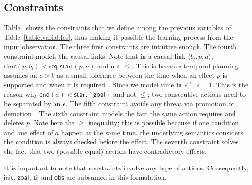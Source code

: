 \documentclass[runningheads]{llncs}
\newcommand{\tup}[1]{{\langle #1 \rangle}}
\newcommand{\obs}{\mathsf{obs}}    %
\newcommand{\start}{\mathsf{start}}%
\newcommand{\en}{\mathsf{end}}     %
\newcommand{\til}{\mathsf{til}}    %
\newcommand{\tim}{\mathsf{time}}   %
\newcommand{\reqs}{\mathsf{req\_{start}}} %
\newcommand{\ini}{\mathsf{init}}   %
\newcommand{\goal}{\mathsf{goal}}  %
\begin{document}
\subsection{Constraints}

Table~\label{table:constraints} shows the constraints that we define among the previous variables of Table~\ref{table:variables}, thus making it possible the learning process from the input observation.  The three first constraints are intuitive enough. The fourth constraint models the causal links. Note that in a causal link $\tup{b_i,p,a}$, $\tim(p,b_i) < \reqs(p,a)$ and not $\leq$. This is because temporal planning assumes an $\epsilon > 0$ as a small tolerance between the time when an effect $p$ is supported and when it is required~\cite{fox2003pddl2}. Since we model time in $\mathbb{Z}^+$, $\epsilon=1$. This is the reason why $\en(a) < \start(\goal)$ and not $\leq$; two consecutive actions need to be separated by an $\epsilon$.
The fifth constraint avoids any threat via promotion or demotion~\cite{ghallab2004automated}. The sixth constraint models the fact the same action requires and deletes $p$. Note here the $\geq$ inequality; this is possible because if one condition and one effect of $a$ happen at the same time, the underlying semantics considers the condition is always checked before the effect. The seventh constraint solves the fact that two (possible equal) actions have contradictory effects.

It is important to note that constraints involve any type of actions. Consequently, $\ini$, $\goal$, $\til$ and $\obs$ are subsumed in this formulation.
\end{document}
